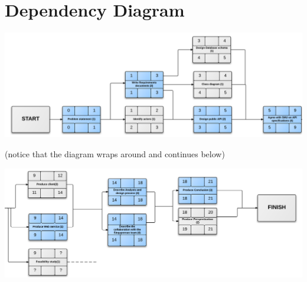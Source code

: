 \section{Dependency Diagram}
\label{app:dependencydiagram}

\includegraphics[scale=0.2]{./Appendices/networkdiag-p1.png}

(notice that the diagram wraps around and continues below)

\includegraphics[scale=0.2]{./Appendices/networkdiag-p2.png}